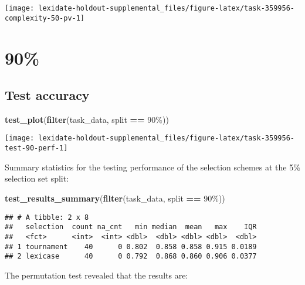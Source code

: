 \documentclass[
]{book}
\newenvironment{Shaded}{\begin{snugshade}}{\end{snugshade}}
\newcommand{\FunctionTok}[1]{\textcolor[rgb]{0.13,0.29,0.53}{\textbf{#1}}}
\newcommand{\NormalTok}[1]{#1}
\newcommand{\SpecialCharTok}[1]{\textcolor[rgb]{0.81,0.36,0.00}{\textbf{#1}}}
\newcommand{\StringTok}[1]{\textcolor[rgb]{0.31,0.60,0.02}{#1}}
\begin{document}
\texttt{[image: lexidate-holdout-supplemental\_files/figure-latex/task-359956-complexity-50-pv-1]}

\hypertarget{section-28}{%
\section{90\%}\label{section-28}}

\hypertarget{test-accuracy-28}{%
\subsection{Test accuracy}\label{test-accuracy-28}}

\begin{Shaded}
\begin{Highlighting}[]
\FunctionTok{test\_plot}\NormalTok{(}\FunctionTok{filter}\NormalTok{(task\_data, split }\SpecialCharTok{==} \StringTok{\textquotesingle{}90\%\textquotesingle{}}\NormalTok{))}
\end{Highlighting}
\end{Shaded}

\texttt{[image: lexidate-holdout-supplemental\_files/figure-latex/task-359956-test-90-perf-1]}

Summary statistics for the testing performance of the selection schemes at the 5\% selection set split:

\begin{Shaded}
\begin{Highlighting}[]
\FunctionTok{test\_results\_summary}\NormalTok{(}\FunctionTok{filter}\NormalTok{(task\_data, split }\SpecialCharTok{==} \StringTok{\textquotesingle{}90\%\textquotesingle{}}\NormalTok{))}
\end{Highlighting}
\end{Shaded}

\begin{verbatim}
## # A tibble: 2 x 8
##   selection  count na_cnt   min median  mean   max    IQR
##   <fct>      <int>  <int> <dbl>  <dbl> <dbl> <dbl>  <dbl>
## 1 tournament    40      0 0.802  0.858 0.858 0.915 0.0189
## 2 lexicase      40      0 0.792  0.868 0.860 0.906 0.0377
\end{verbatim}

The permutation test revealed that the results are:
\end{document}
